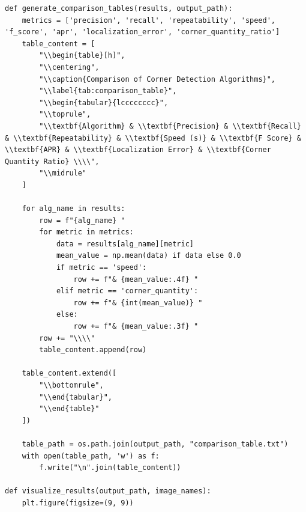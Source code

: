 \documentclass[journal]{IEEEtran}
\begin{document}
\begin{lstlisting}[style=python, caption={Utility Functions for Data Processing}, label={lst:utilities}]
def generate_comparison_tables(results, output_path):
    metrics = ['precision', 'recall', 'repeatability', 'speed', 'f_score', 'apr', 'localization_error', 'corner_quantity_ratio']
    table_content = [
        "\\begin{table}[h]",
        "\\centering",
        "\\caption{Comparison of Corner Detection Algorithms}",
        "\\label{tab:comparison_table}",
        "\\begin{tabular}{lcccccccc}",
        "\\toprule",
        "\\textbf{Algorithm} & \\textbf{Precision} & \\textbf{Recall} & \\textbf{Repeatability} & \\textbf{Speed (s)} & \\textbf{F Score} & \\textbf{APR} & \\textbf{Localization Error} & \\textbf{Corner Quantity Ratio} \\\\",
        "\\midrule"
    ]
    
    for alg_name in results:
        row = f"{alg_name} "
        for metric in metrics:
            data = results[alg_name][metric]
            mean_value = np.mean(data) if data else 0.0
            if metric == 'speed':
                row += f"& {mean_value:.4f} "
            elif metric == 'corner_quantity':
                row += f"& {int(mean_value)} "
            else:
                row += f"& {mean_value:.3f} "
        row += "\\\\"
        table_content.append(row)
    
    table_content.extend([
        "\\bottomrule",
        "\\end{tabular}",
        "\\end{table}"
    ])
    
    table_path = os.path.join(output_path, "comparison_table.txt")
    with open(table_path, 'w') as f:
        f.write("\n".join(table_content))

def visualize_results(output_path, image_names):
    plt.figure(figsize=(9, 9))
    

\end{lstlisting}
\end{document}
